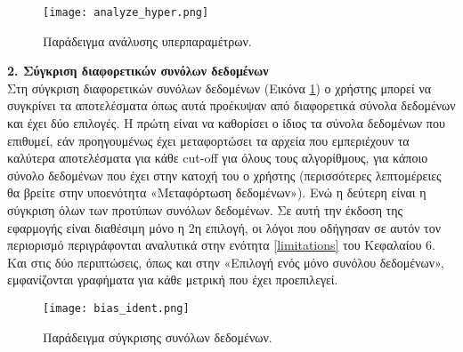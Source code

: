 \newpage
\begin{figure}[H]
	\centering
	\texttt{[image: analyze\_hyper.png]}
	\caption{Παράδειγμα ανάλυσης υπερπαραμέτρων.}
	\label{fig:hyper}
\end{figure}
\noindent \textbf{2. Σύγκριση διαφορετικών συνόλων δεδομένων}
\\Στη σύγκριση διαφορετικών συνόλων δεδομένων (Εικόνα \ref{fig:hyper}) ο χρήστης μπορεί να συγκρίνει τα αποτελέσματα όπως αυτά προέκυψαν από διαφορετικά σύνολα δεδομένων και έχει δύο επιλογές. Η πρώτη είναι να καθορίσει ο ίδιος τα σύνολα δεδομένων που επιθυμεί, εάν προηγουμένως έχει μεταφορτώσει τα αρχεία που εμπεριέχουν τα καλύτερα αποτελέσματα για κάθε cut-off για όλους τους αλγορίθμους, για κάποιο σύνολο δεδομένων που έχει στην κατοχή του ο χρήστης (περισσότερες λεπτομέρειες θα βρείτε στην υποενότητα «Μεταφόρτωση δεδομένων»). Ενώ η δεύτερη είναι η σύγκριση όλων των προτύπων συνόλων δεδομένων. Σε αυτή την έκδοση της εφαρμογής είναι διαθέσιμη μόνο η 2η επιλογή, οι λόγοι που οδήγησαν σε αυτόν τον περιορισμό περιγράφονται αναλυτικά στην ενότητα \ref{limitations} του Κεφαλαίου 6. Και στις δύο περιπτώσεις, όπως και στην «Επιλογή ενός μόνο συνόλου δεδομένων», εμφανίζονται γραφήματα για κάθε μετρική που έχει προεπιλεγεί.
\newpage
\begin{figure}[H]
	\centering
	\texttt{[image: bias\_ident.png]}
	\caption{Παράδειγμα σύγκρισης συνόλων δεδομένων.}
	\label{fig:compare}
\end{figure}
